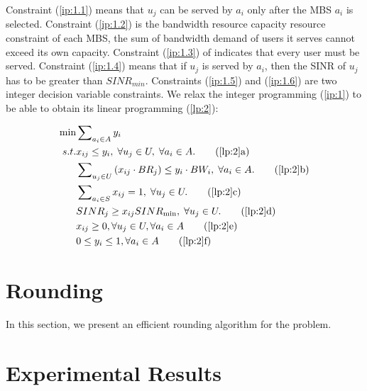 \documentclass[11pt,a4paper]{article}
\begin{document}
Constraint (\ref{ip:1.1}) means that $u_j$ can be served by $a_i$ only after the MBS $a_i$ is selected. Constraint (\ref{ip:1.2}) is the bandwidth resource capacity resource constraint of each MBS, the sum of bandwidth demand of users it serves cannot exceed its own capacity. Constraint (\ref{ip:1.3}) of indicates that every user must be served. Constraint (\ref{ip:1.4}) means that if $u_j$ is served by $a_i$, then the SINR of $u_j$ has to be greater than $SINR_{min}$. Constraints (\ref{ip:1.5}) and (\ref{ip:1.6}) are two integer decision variable constraints. We relax the integer programming (\ref{ip:1}) to be able to obtain its linear programming (\ref{lp:2}):

\begin{align}
	\min  & \sum\nolimits_{{a_i} \in A} {{y_i}}  \label{lp:2}\\
	s.t. &  {x_{ij}} \le {y_i},\;\forall {u_j} \in U,\;\forall {a_i} \in A. \tag{\ref{lp:2}{a}}\label{lp:2.1}\\
	&  \sum\nolimits_{{u_j} \in U} {({x_{ij}} \cdot B{R_j})}  \le {y_i} \cdot B{W_i},\;\forall {a_i} \in A. \tag{\ref{lp:2}{b}}\label{lp:2.2}\\
	&  \sum\nolimits_{{a_i} \in S} {{x_{ij}}}  = 1,\;\forall {u_j} \in U. \tag{\ref{lp:2}{c}}\label{lp:2.3}\\
	&  SIN{R_j} \ge {x_{ij}}SIN{R_{\min }},\;\forall {u_j} \in U. \tag{\ref{lp:2}{d}}\label{lp:2.4}\\
	&  {x_{ij}} \ge 0,\forall u_j \in U,\forall {a_i} \in A \tag{\ref{lp:2}{e}}\label{lp:2.5}\\
	&  0 \le {y_i} \le 1,\forall {a_i} \in A \tag{\ref{lp:2}{f}}\label{lp:2.6}
\end{align}

\section{Rounding}
In this section, we present an efficient rounding algorithm for the problem.

\section{Experimental Results}
\end{document}
